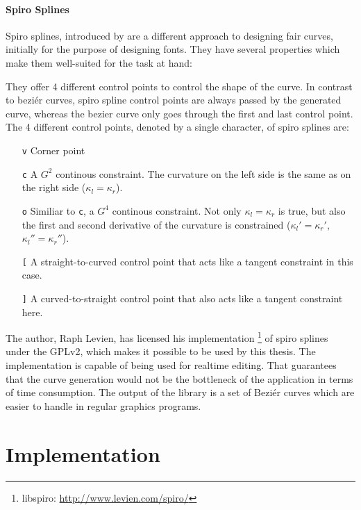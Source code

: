 \documentclass[10pt,twoside,a4paper]{report}
\begin{document}
\subsubsection{Spiro Splines}

Spiro splines, introduced by \cite{levien2009spiral} are a different approach to designing fair curves, initially for the purpose of designing fonts. They have several properties which make them well-suited for the task at hand:

They offer 4 different control points to control the shape of the curve. In contrast to beziér curves, spiro spline control points are always passed by the generated curve, whereas the bezier curve only goes through the first and last control point. The 4 different control points, denoted by a single character, of spiro splines are:

\begin{itemize}
\item[\texttt{v}] Corner point
\item[\texttt{c}] A $G^2$ continous constraint. The curvature  on the left side is the same as on the right side ($\kappa_l = \kappa_r$).
\item[\texttt{o}] Similiar to \texttt{c}, a $G^4$ continous constraint. Not only $\kappa_l = \kappa_r$ is true, but also the first and second derivative of the curvature is constrained ($\kappa_l' = \kappa_r'$, $\kappa_l'' = \kappa_r''$).
\item[\texttt{[}] A straight-to-curved control point that acts like a tangent constraint in this case.
\item[\texttt{]}] A curved-to-straight control point that also acts like a tangent constraint here.
\end{itemize}

The author, Raph Levien, has licensed his implementation \footnote{libspiro: \url{http://www.levien.com/spiro/} } of spiro splines under the GPLv2, which makes it possible to be used by this thesis. The implementation is capable of being used for realtime editing. That guarantees that the curve generation would not be the bottleneck of the application in terms of time consumption. The output of the library is a set of Beziér curves which are easier to handle in regular graphics programs.



\chapter{Implementation}
\end{document}
